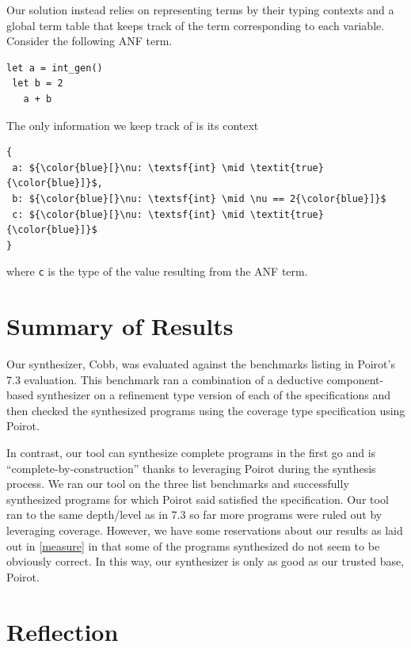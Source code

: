 \documentclass[review, sigplan]{acmart}
\begin{document}
Our solution instead relies on representing terms by their
typing contexts and a global term table that keeps track of
the term corresponding to each variable.
Consider the following ANF term.
\begin{lstlisting}[language=caml, basicstyle=\small\ttfamily]
let a = int_gen()
 let b = 2
   a + b
\end{lstlisting}
The only information we keep track of is its context

\begin{lstlisting}[language=caml, basicstyle=\small\ttfamily, mathescape]
{
 a: ${\color{blue}[}\nu: \textsf{int} \mid \textit{true}{\color{blue}]}$,
 b: ${\color{blue}[}\nu: \textsf{int} \mid \nu == 2{\color{blue}]}$
 c: ${\color{blue}[}\nu: \textsf{int} \mid \textit{true}{\color{blue}]}$
}
\end{lstlisting}
where \lstinline|c| is the type of the value resulting from the
ANF term.

\section{Summary of Results}
Our synthesizer, Cobb, was evaluated against the benchmarks listing in Poirot's
7.3 evaluation. This benchmark ran a combination of a deductive component-based
synthesizer on a refinement type version of each of the specifications and then
checked the synthesized programs using the coverage type specification using
Poirot.

In contrast, our tool can synthesize complete programs in the first go and is
``complete-by-construction'' thanks to leveraging Poirot during the synthesis
process. We ran our tool on the three list benchmarks and successfully
synthesized programs for which Poirot said satisfied the specification. Our tool
ran to the same depth/level as in 7.3 so far more programs were ruled out by
leveraging coverage. However, we have some reservations about our results as
laid out in \ref{measure} in that some of the programs synthesized do not seem
to be obviously correct. In this way, our synthesizer is only as good as our
trusted base, Poirot.

\section{Reflection}
\end{document}
